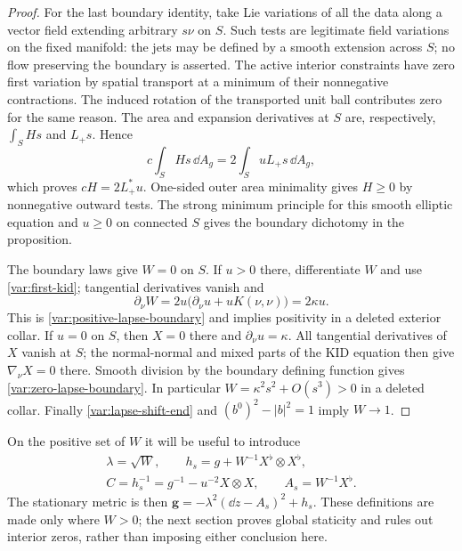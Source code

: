\begin{proof}
For the last boundary identity, take Lie variations
of all the data along a vector field extending
arbitrary $s\nu$ on $S$.  Such tests are legitimate
field variations on the fixed manifold: the jets
may be defined by a smooth extension across $S$;
no flow preserving the boundary is asserted.
The active interior constraints have zero first
variation by spatial transport at a minimum of
their nonnegative contractions.  The induced
rotation of the transported unit ball contributes
zero for the same reason.  The area and expansion
derivatives at $S$ are, respectively, $\int_SHs$
and $L_+s$.  Hence
\begin{equation*}
 c\int_SHs\,\dd A_g=2\int_SuL_+s\,\dd A_g,
 \end{equation*}
which proves $cH=2L_+^*u$.
One-sided outer area minimality gives $H\ge0$ by
nonnegative outward tests.  The strong minimum
principle for this smooth elliptic equation and
$u\ge0$ on connected $S$ gives the boundary
dichotomy in the proposition.

The boundary laws give $W=0$ on $S$.  If $u>0$
there, differentiate $W$ and use
\eqref{var:first-kid}; tangential derivatives
vanish and
\begin{equation*}
 \partial_\nu W
   =2u\bigl(\partial_\nu u+uK(\nu,\nu)\bigr)
   =2\kappa u.
\end{equation*}
This is \eqref{var:positive-lapse-boundary} and
implies positivity in a deleted exterior collar.
If $u=0$ on $S$, then $X=0$ there and
$\partial_\nu u=\kappa$.  All tangential derivatives
of $X$ vanish at $S$; the normal-normal and mixed
parts of the KID equation then give
$\nabla_\nu X=0$ there.  Smooth division by the
boundary defining function gives
\eqref{var:zero-lapse-boundary}.  In particular
$W=\kappa^2s^2+O(s^3)>0$ in a deleted collar.
Finally \eqref{var:lapse-shift-end} and
$(b^0)^2-|b|^2=1$ imply $W\to1$.
\end{proof}

On the positive set of $W$ it will be useful to introduce
\begin{equation}
\begin{gathered}
 \lambda=\sqrt W,\qquad
 h_s=g+W^{-1}X^\flat\otimes X^\flat,\\
 C=h_s^{-1}=g^{-1}-u^{-2}X\otimes X,\qquad
 A_s=W^{-1}X^\flat.
\end{gathered}
 \label{var:orbit-metric}
\end{equation}
The stationary metric is then
$\mathbf g=-\lambda^2(\dd z-A_s)^2+h_s$.
These definitions are made only where $W>0$; the next
section proves global staticity and rules out interior
zeros, rather than imposing either conclusion here.
